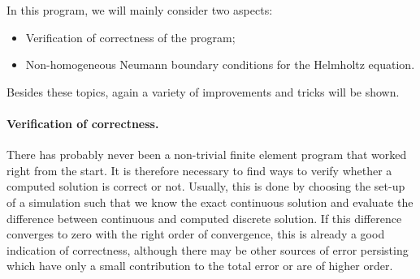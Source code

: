 \documentclass{article}
\begin{document}
In this program, we will mainly consider two aspects:
\begin{itemize}
\item Verification of correctness of the program;
\item Non-homogeneous Neumann boundary conditions for the Helmholtz equation.
\end{itemize}
Besides these topics, again a variety of improvements and tricks will be
shown. 

\paragraph{Verification of correctness.} There has probably never been a
non-trivial finite element program that worked right from the start. It is
therefore necessary to find ways to verify whether a computed solution is
correct or not. Usually, this is done by choosing the set-up of a simulation
such that we know the exact continuous solution and evaluate the difference
between continuous and computed discrete solution. If this difference
converges to zero with the right order of convergence, this is already a good
indication of correctness, although there may be other sources of error
persisting which have only a small contribution to the total error or are of
higher order.
\end{document}
